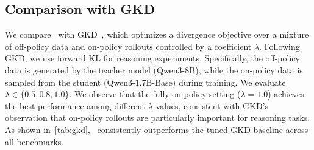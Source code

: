 \subsection{Comparison with GKD} \label{sec:gkd}
We compare \method~with GKD~\cite{agarwal2024policy}, which optimizes a divergence objective over a mixture of off-policy data and on-policy rollouts controlled by a coefficient $\lambda$. Following GKD, we use forward KL for reasoning experiments.
Specifically, the off-policy data is generated by the teacher model (Qwen3-8B), while the on-policy data is sampled from the student (Qwen3-1.7B-Base) during training. We evaluate $\lambda \in \{0.5, 0.8, 1.0\}$.
We observe that the fully on-policy setting ($\lambda = 1.0$) achieves the best performance among different $\lambda$ values, consistent with GKD’s observation that on-policy rollouts are particularly important for reasoning tasks. As shown in~\autoref{tab:gkd}, \method~consistently outperforms the tuned GKD baseline across all benchmarks.
\begin{table}[ht]
\centering
\caption{Comparison with GKD baselines for the Qwen3-1.7B-Base student. We evaluate GKD with different $\lambda$ values following the original setup. \method~consistently outperforms all GKD variants across reasoning benchmarks. \textbf{Bold} indicates best performance and \underline{underline} indicates second-best.}
\label{tab:gkd}
\end{table}


